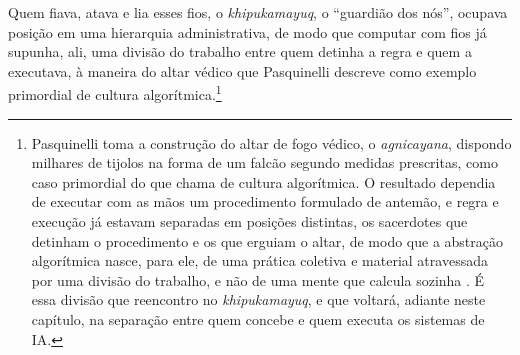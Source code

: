 Quem fiava, atava e lia esses fios, o \textit{khipukamayuq}, o \enquote{guardião dos nós}, ocupava posição em uma hierarquia administrativa, de modo que computar com fios já supunha, ali, uma divisão do trabalho entre quem detinha a regra e quem a executava, à maneira do altar védico que Pasquinelli descreve como exemplo primordial de cultura algorítmica.\footnote{Pasquinelli toma a construção do altar de fogo védico, o \textit{agnicayana}, dispondo milhares de tijolos na forma de um falcão segundo medidas prescritas, como caso primordial do que chama de cultura algorítmica. O resultado dependia de executar com as mãos um procedimento formulado de antemão, e regra e execução já estavam separadas em posições distintas, os sacerdotes que detinham o procedimento e os que erguiam o altar, de modo que a abstração algorítmica nasce, para ele, de uma prática coletiva e material atravessada por uma divisão do trabalho, e não de uma mente que calcula sozinha \parencite[cap.~1]{Pasquinelli_EyeMaster_2023}. É essa divisão que reencontro no \textit{khipukamayuq}, e que voltará, adiante neste capítulo, na separação entre quem concebe e quem executa os sistemas de IA.}


